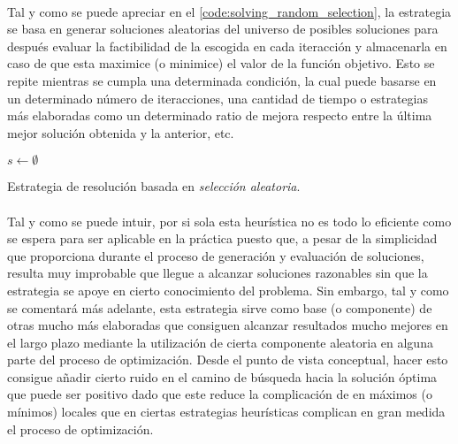 \documentclass{subfiles}
\begin{document}
        \paragraph{}
        Tal y como se puede apreciar en el \cref{code:solving_random_selection}, la estrategia se basa en generar soluciones aleatorias del universo de posibles soluciones para después evaluar la factibilidad de la escogida en cada iteracción y almacenarla en caso de que esta maximice (o minimice) el valor de la función objetivo. Esto se repite mientras se cumpla una determinada condición, la cual puede basarse en un determinado número de iteracciones, una cantidad de tiempo o estrategias más elaboradas como un determinado ratio de mejora respecto entre la última mejor solución obtenida y la anterior, etc.

        \begin{algorithm}[ht]
          \SetAlgoLined
          $s \gets \emptyset$\;
          \caption{Estrategia de resolución basada en \emph{selección aleatoria}.}
          \label{code:solving_random_selection}
        \end{algorithm}

        \paragraph{}
        Tal y como se puede intuir, por si sola esta heurística no es todo lo eficiente como se espera para ser aplicable en la práctica puesto que, a pesar de la simplicidad que proporciona durante el proceso de generación y evaluación de soluciones, resulta muy improbable que llegue a alcanzar soluciones razonables sin que la estrategia se apoye en cierto conocimiento del problema. Sin embargo, tal y como se comentará más adelante, esta estrategia sirve como base (o componente) de otras mucho más elaboradas que consiguen alcanzar resultados mucho mejores en el largo plazo mediante la utilización de cierta componente aleatoria en alguna parte del proceso de optimización. Desde el punto de vista conceptual, hacer esto consigue añadir cierto ruido en el camino de búsqueda hacia la solución óptima que puede ser positivo dado que este reduce la complicación de  en máximos (o mínimos) locales que en ciertas estrategias heurísticas complican en gran medida el proceso de optimización.
\end{document}
